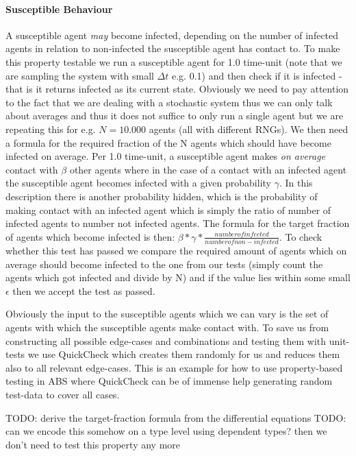 \paragraph{Susceptible Behaviour}
A susceptible agent \textit{may} become infected, depending on the number of infected agents in relation to non-infected the susceptible agent has contact to. To make this property testable we run a susceptible agent for 1.0 time-unit (note that we are sampling the system with small $\Delta t$ e.g. 0.1) and then check if it is infected - that is it returns infected as its current state. Obviously we need to pay attention to the fact that we are dealing with a stochastic system thus we can only talk about averages and thus it does not suffice to only run a single agent but we are repeating this for e.g. $N = 10.000$ agents (all with different RNGs). We then need a formula for the required fraction of the N agents which should have become infected on average. Per 1.0 time-unit, a susceptible agent makes \textit{on average} contact with $\beta$ other agents where in the case of a contact with an infected agent the susceptible agent becomes infected with a given probability $\gamma$. In this description there is another probability hidden, which is the probability of making contact with an infected agent which is simply the ratio of number of infected agents to number not infected agents. The formula for the target fraction of agents which become infected is then: $\beta * \gamma * \frac{number of infected}{number of non-infected}$. To check whether this test has passed we compare the required amount of agents which on average should become infected to the one from our tests (simply count the agents which got infected and divide by N) and if the value lies within some small $\epsilon$ then we accept the test as passed.

Obviously the input to the susceptible agents which we can vary is the set of agents with which the susceptible agents make contact with. To save us from constructing all possible edge-cases and combinations and testing them with unit-tests we use QuickCheck which creates them randomly for us and reduces them also to all relevant edge-cases. This is an example for how to use property-based testing in ABS where QuickCheck can be of immense help generating random test-data to cover all cases.

TODO: derive the target-fraction formula from the differential equations
TODO: can we encode this somehow on a type level using dependent types? then we don't need to test this property any more

